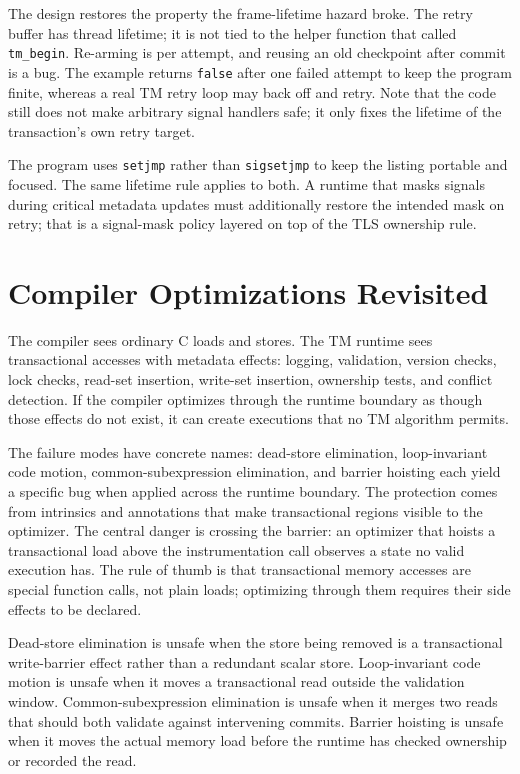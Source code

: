 The design restores the property the frame-lifetime hazard broke. The retry buffer has thread lifetime; it is not tied to the helper function that called \texttt{tm\_begin}. Re-arming is per attempt, and reusing an old checkpoint after commit is a bug. The example returns \texttt{false} after one failed attempt to keep the program finite, whereas a real TM retry loop may back off and retry. Note that the code still does not make arbitrary signal handlers safe; it only fixes the lifetime of the transaction's own retry target.

The program uses \texttt{setjmp} rather than \texttt{sigsetjmp} to keep the listing portable and focused.  The same lifetime rule applies to both.  A runtime that masks signals during critical metadata updates must additionally restore the intended mask on retry; that is a signal-mask policy layered on top of the TLS ownership rule.

\section{Compiler Optimizations Revisited}

The compiler sees ordinary C loads and stores.  The TM runtime sees transactional accesses with metadata effects: logging, validation, version checks, lock checks, read-set insertion, write-set insertion, ownership tests, and conflict detection.  If the compiler optimizes through the runtime boundary as though those effects do not exist, it can create executions that no TM algorithm permits.

The failure modes have concrete names: dead-store elimination, loop-invariant code motion, common-subexpression elimination, and barrier hoisting each yield a specific bug when applied across the runtime boundary. The protection comes from intrinsics and annotations that make transactional regions visible to the optimizer. The central danger is crossing the barrier: an optimizer that hoists a transactional load above the instrumentation call observes a state no valid execution has. The rule of thumb is that transactional memory accesses are special function calls, not plain loads; optimizing through them requires their side effects to be declared.

Dead-store elimination is unsafe when the store being removed is a transactional write-barrier effect rather than a redundant scalar store.  Loop-invariant code motion is unsafe when it moves a transactional read outside the validation window.  Common-subexpression elimination is unsafe when it merges two reads that should both validate against intervening commits.  Barrier hoisting is unsafe when it moves the actual memory load before the runtime has checked ownership or recorded the read.

